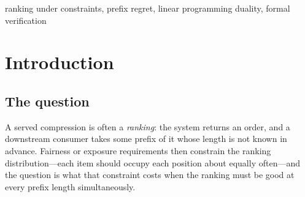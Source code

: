 \begin{abstract}
results are unconditional. Their upper side is ONE actual law on all $m!$ permutations of
$g_{m}$ that carries the band and the value at once: the insertion mixture, with an
independent sign flip for even $m$, symmetrised within weight classes. The flat-augmented
mixture of the zero-band construction is a different object: its marginals are exactly
uniform (), but its value is the zero-band value $4/m(m+4)$, not
$V^{\mathrm{free}}_{m}$ --- at $m=4$ these are $1/8$ and $1/12$ --- so it is not an endpoint
witness. On the odd side we claim the zero-band value and the breakpoint, not the curve
between them; that, and the collapse scale of the robustness floor, are open and named
below. A second linear factor comes from timing, not from the band. If the budget is chosen
after the ranking is drawn, the free value is $\mathbb{E}\max_{k}r_{k}=2/(m+4)$ at every
$m\ge3$, exactly $m-1$ times the ex-ante $V^{\mathrm{free}}_{m}$ ().
The banded ex-post problem is not solved, and the two factors are not multiplied.
Randomised rankings under marginal constraints are a studied object; what we claim is the
exact signed-prefix law, its parity dependence, and the quantitative price.
\end{abstract}

\begin{IEEEkeywords}
ranking under constraints, prefix regret, linear programming duality, formal verification
\end{IEEEkeywords}

\section{Introduction}
\label{sec:intro}

\subsection{The question}

A served compression is often a \emph{ranking}: the system returns an order, and a
downstream consumer takes some prefix of it whose length is not known in advance. Fairness
or exposure requirements then constrain the ranking distribution---each item should occupy
each position about equally often---and the question is what that constraint costs when the
ranking must be good at every prefix length simultaneously.

